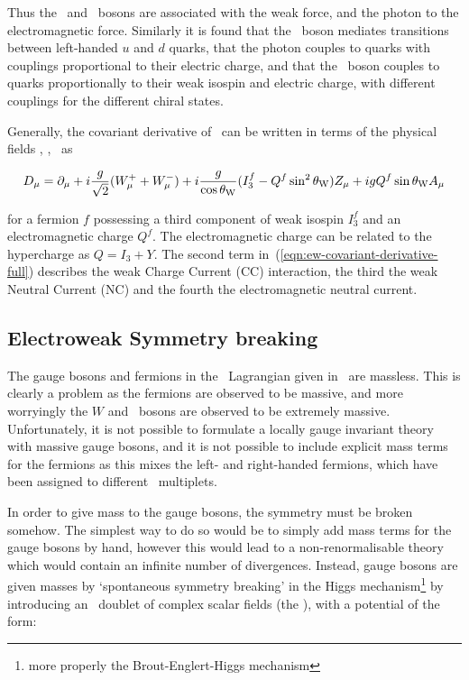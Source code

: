 Thus the \W\ and \Z\ bosons are associated with the weak force, and the photon
to the electromagnetic force. Similarly it is found that the \W\ boson mediates
transitions between left-handed $u$ and $d$ quarks, that the photon couples to
quarks with couplings proportional to their electric charge, and that the
\Z\ boson couples to quarks proportionally to their weak isospin and electric
charge, with different couplings for the different chiral states.

Generally, the covariant derivative of~ can be
written in terms of the physical fields \Wpmmu, \Zmu, \Amu\ as

\begin{equation}
D_{\mu}  =  \partial_{\mu} + i \frac{g}{\sqrt{2}} ( W^{+}_{\mu} + W^{-}_{\mu} ) 
+ i \frac{g}{\cos{\ensuremath{\theta_{\mathrm{W}}}}} ( I^{f}_{3} - Q^{f} \sin^{2}{\theta_{\mathrm{W}}} ) Z_{\mu}
+ i g Q^{f} \sin{\ensuremath{\theta_{\mathrm{W}}}} A_{\mu}
\label{eqn:ew-covariant-derivative-full}
\end{equation}

for a fermion $f$ possessing a third component of weak isospin $I_{3}^{f}$
and an electromagnetic charge $Q^{f}$. The electromagnetic charge can be related
to the hypercharge as $Q = I_{3} + Y$. The second term
in~(\ref{eqn:ew-covariant-derivative-full}) describes the weak Charge Current (CC)
interaction, the third the weak Neutral Current (NC) and the fourth the
electromagnetic neutral current.

\subsection{Electroweak Symmetry breaking}

The gauge bosons and fermions in the \ew\ Lagrangian given
in~ are massless. This is clearly a problem as the fermions
are observed to be massive, and more worryingly the $W$ and \Z\ bosons are
observed to be extremely massive. Unfortunately, it is not possible to formulate a locally gauge invariant theory with massive
gauge bosons, and it is not possible to include explicit mass terms for the
fermions as this mixes the left- and right-handed fermions, which have been
assigned to different \sutwo\ multiplets. 

In order to give
mass to the gauge bosons, the symmetry must be broken somehow. The simplest way
to do so would be to simply add mass terms for the gauge bosons by hand, however
this would lead to a non-renormalisable theory which would contain an infinite
number of divergences. Instead, gauge bosons are given masses by `spontaneous
symmetry breaking' in the Higgs mechanism\footnote{more properly the Brout-Englert-Higgs
mechanism} by introducing an \sutwo\ doublet of complex scalar fields (the ), with a potential of the form:

